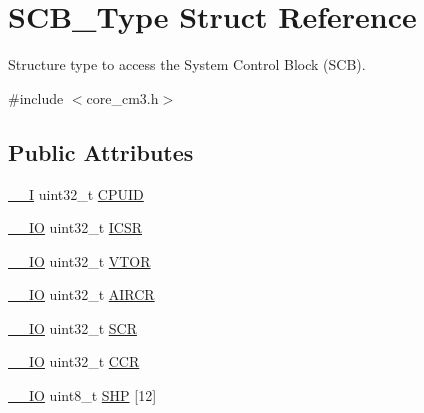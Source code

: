 \hypertarget{struct_s_c_b___type}{\section{S\-C\-B\-\_\-\-Type Struct Reference}
\label{struct_s_c_b___type}
}


Structure type to access the System Control Block (S\-C\-B).  




{\ttfamily \#include $<$core\-\_\-cm3.\-h$>$}

\subsection*{Public Attributes}
\begin{DoxyCompactItemize}
\item 
\hyperlink{group___c_m_s_i_s__core__definitions_gaf63697ed9952cc71e1225efe205f6cd3}{\-\_\-\-\_\-\-I} uint32\-\_\-t \hyperlink{struct_s_c_b___type_afa7a9ee34dfa1da0b60b4525da285032}{C\-P\-U\-I\-D}
\item 
\hyperlink{group___c_m_s_i_s__core__definitions_gaec43007d9998a0a0e01faede4133d6be}{\-\_\-\-\_\-\-I\-O} uint32\-\_\-t \hyperlink{struct_s_c_b___type_a3e66570ab689d28aebefa7e84e85dc4a}{I\-C\-S\-R}
\item 
\hyperlink{group___c_m_s_i_s__core__definitions_gaec43007d9998a0a0e01faede4133d6be}{\-\_\-\-\_\-\-I\-O} uint32\-\_\-t \hyperlink{struct_s_c_b___type_a0faf96f964931cadfb71cfa54e051f6f}{V\-T\-O\-R}
\item 
\hyperlink{group___c_m_s_i_s__core__definitions_gaec43007d9998a0a0e01faede4133d6be}{\-\_\-\-\_\-\-I\-O} uint32\-\_\-t \hyperlink{struct_s_c_b___type_a6ed3c9064013343ea9fd0a73a734f29d}{A\-I\-R\-C\-R}
\item 
\hyperlink{group___c_m_s_i_s__core__definitions_gaec43007d9998a0a0e01faede4133d6be}{\-\_\-\-\_\-\-I\-O} uint32\-\_\-t \hyperlink{struct_s_c_b___type_abfad14e7b4534d73d329819625d77a16}{S\-C\-R}
\item 
\hyperlink{group___c_m_s_i_s__core__definitions_gaec43007d9998a0a0e01faede4133d6be}{\-\_\-\-\_\-\-I\-O} uint32\-\_\-t \hyperlink{struct_s_c_b___type_a6d273c6b90bad15c91dfbbad0f6e92d8}{C\-C\-R}
\item 
\hyperlink{group___c_m_s_i_s__core__definitions_gaec43007d9998a0a0e01faede4133d6be}{\-\_\-\-\_\-\-I\-O} uint8\-\_\-t \hyperlink{struct_s_c_b___type_a543537c7b61874db058cc8e91a7aff0e}{S\-H\-P} \mbox{[}12\mbox{]}
\item 

\end{DoxyCompactItemize}
